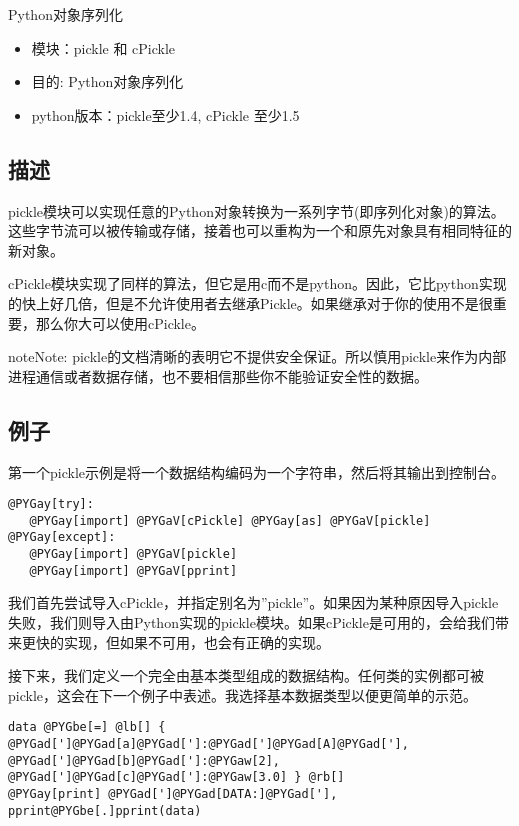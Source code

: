 \documentclass[a4paper,10pt,english]{manual}
\begin{document}
Python对象序列化
\begin{itemize}
\item {} 
模块：pickle 和 cPickle

\item {} 
目的: Python对象序列化

\item {} 
python版本：pickle至少1.4, cPickle 至少1.5

\end{itemize}


\subsection{描述}

pickle模块可以实现任意的Python对象转换为一系列字节(即序列化对象)的算法。这些字节流可以被传输或存储，接着也可以重构为一个和原先对象具有相同特征的新对象。

cPickle模块实现了同样的算法，但它是用c而不是python。因此，它比python实现的快上好几倍，但是不允许使用者去继承Pickle。如果继承对于你的使用不是很重要，那么你大可以使用cPickle。

\begin{notice}{note}{Note:}
pickle的文档清晰的表明它不提供安全保证。所以慎用pickle来作为内部进程通信或者数据存储，也不要相信那些你不能验证安全性的数据。
\end{notice}


\subsection{例子}

第一个pickle示例是将一个数据结构编码为一个字符串，然后将其输出到控制台。

\begin{Verbatim}[commandchars=@\[\]]
@PYGay[try]:
   @PYGay[import] @PYGaV[cPickle] @PYGay[as] @PYGaV[pickle]
@PYGay[except]:
   @PYGay[import] @PYGaV[pickle]
   @PYGay[import] @PYGaV[pprint]
\end{Verbatim}

我们首先尝试导入cPickle，并指定别名为''pickle''。如果因为某种原因导入pickle失败，我们则导入由Python实现的pickle模块。如果cPickle是可用的，会给我们带来更快的实现，但如果不可用，也会有正确的实现。

接下来，我们定义一个完全由基本类型组成的数据结构。任何类的实例都可被pickle，这会在下一个例子中表述。我选择基本数据类型以便更简单的示范。

\begin{Verbatim}[commandchars=@\[\]]
data @PYGbe[=] @lb[] { @PYGad[']@PYGad[a]@PYGad[']:@PYGad[']@PYGad[A]@PYGad['], @PYGad[']@PYGad[b]@PYGad[']:@PYGaw[2], @PYGad[']@PYGad[c]@PYGad[']:@PYGaw[3.0] } @rb[]
@PYGay[print] @PYGad[']@PYGad[DATA:]@PYGad['],
pprint@PYGbe[.]pprint(data)
\end{Verbatim}
\end{document}
